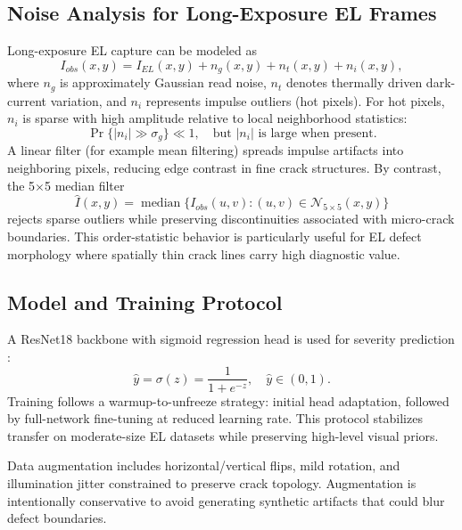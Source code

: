 \documentclass[journal]{IEEEtran}
\begin{document}
\subsection{Noise Analysis for Long-Exposure EL Frames}
Long-exposure EL capture can be modeled as
\begin{equation}
I_{obs}(x,y)=I_{EL}(x,y)+n_g(x,y)+n_t(x,y)+n_i(x,y),
\label{eq:noise_model}
\end{equation}
where $n_g$ is approximately Gaussian read noise, $n_t$ denotes thermally driven dark-current variation, and $n_i$ represents impulse outliers (hot pixels). For hot pixels, $n_i$ is sparse with high amplitude relative to local neighborhood statistics:
\begin{equation}
\Pr\{|n_i|\gg \sigma_g\} \ll 1, \quad \text{but } |n_i| \text{ is large when present.}
\label{eq:impulse_model}
\end{equation}
A linear filter (for example mean filtering) spreads impulse artifacts into neighboring pixels, reducing edge contrast in fine crack structures. By contrast, the 5$\times$5 median filter
\begin{equation}
\hat{I}(x,y)=\operatorname{median}\{I_{obs}(u,v):(u,v)\in\mathcal{N}_{5\times5}(x,y)\}
\label{eq:median}
\end{equation}
rejects sparse outliers while preserving discontinuities associated with micro-crack boundaries. This order-statistic behavior is particularly useful for EL defect morphology where spatially thin crack lines carry high diagnostic value.

\subsection{Model and Training Protocol}
A ResNet18 backbone with sigmoid regression head is used for severity prediction \cite{He2016}:
\begin{equation}
\hat{y}=\sigma(z)=\frac{1}{1+e^{-z}},\quad \hat{y}\in(0,1).
\label{eq:sigmoid_output}
\end{equation}
Training follows a warmup-to-unfreeze strategy: initial head adaptation, followed by full-network fine-tuning at reduced learning rate. This protocol stabilizes transfer on moderate-size EL datasets while preserving high-level visual priors.

Data augmentation includes horizontal/vertical flips, mild rotation, and illumination jitter constrained to preserve crack topology. Augmentation is intentionally conservative to avoid generating synthetic artifacts that could blur defect boundaries.
\end{document}
